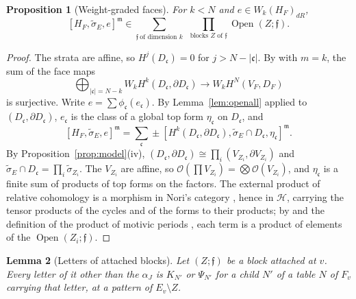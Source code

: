 \documentclass[11pt]{article}
\theoremstyle{plain}
\newtheorem{prop}{Proposition}[section]
\newtheorem{lemma}[prop]{Lemma}
\theoremstyle{definition}
\theoremstyle{remark}
\newcommand{\m}{\mathfrak m}
\newcommand{\ff}{\mathfrak f}
\newcommand{\Open}{\operatorname{Open}}
\newcommand{\tsig}{\widetilde\sigma}
\begin{document}
\begin{prop}[Weight-graded faces]\label{prop:weights}
For $k<N$ and $e\in W_k(H_F)_{dR}$,
\[
[H_F,\tsig_E,e]^{\m}\in\sum_{\ff\ \text{of dimension }k}\ \ \prod_{\text{blocks }Z\text{ of }\ff}\Open(Z;\ff).
\]
\end{prop}

\begin{proof}
The strata are affine, so $H^j(D_{\mathfrak c})=0$ for $j>N-|\mathfrak c|$. By \cite[Prop.~10.7]{B1} with $m=k$, the sum of the face maps
\[
\bigoplus_{|\mathfrak c|=N-k}W_kH^k(D_{\mathfrak c},\partial D_{\mathfrak c})\to W_kH^N(V_F,D_F)
\]
is surjective. Write $e=\sum\phi_{\mathfrak c}(e_{\mathfrak c})$. By Lemma~\ref{lem:openall} applied to $(D_{\mathfrak c},\partial D_{\mathfrak c})$, $e_{\mathfrak c}$ is the class of a global top form $\eta_{\mathfrak c}$ on $D_{\mathfrak c}$, and
\[
[H_F,\tsig_E,e]^{\m}=\sum_{\mathfrak c}\pm[H^k(D_{\mathfrak c},\partial D_{\mathfrak c}),\tsig_E\cap D_{\mathfrak c},\eta_{\mathfrak c}]^{\m}.
\]
By Proposition~\ref{prop:model}(iv), $(D_{\mathfrak c},\partial D_{\mathfrak c})\cong\prod_i(V_{Z_i},\partial V_{Z_i})$ and $\tsig_E\cap D_{\mathfrak c}=\prod_i\tsig_{Z_i}$. The $V_{Z_i}$ are affine, so $\mathcal O(\prod V_{Z_i})=\bigotimes\mathcal O(V_{Z_i})$, and $\eta_{\mathfrak c}$ is a finite sum of products of top forms on the factors. The external product of relative cohomology is a morphism in Nori's category \cite{HMS}, hence in $\mathcal H$, carrying the tensor products of the cycles and of the forms to their products; by \cite[\S2.2(ii)]{B1} and the definition of the product of motivic periods \cite[\S2]{B1}, each term is a product of elements of the $\Open(Z_i;\ff)$.
\end{proof}

\begin{lemma}[Letters of attached blocks]\label{lem:attach}
Let $(Z;\ff)$ be a block attached at $v$. Every letter of it other than the $\alpha_J$ is $K_{N'}$ or $\Psi_{N'}$ for a child $N'$ of a table $N$ of $F_v$ carrying that letter, at a pattern of $E_v\setminus Z$.
\end{lemma}
\end{document}
